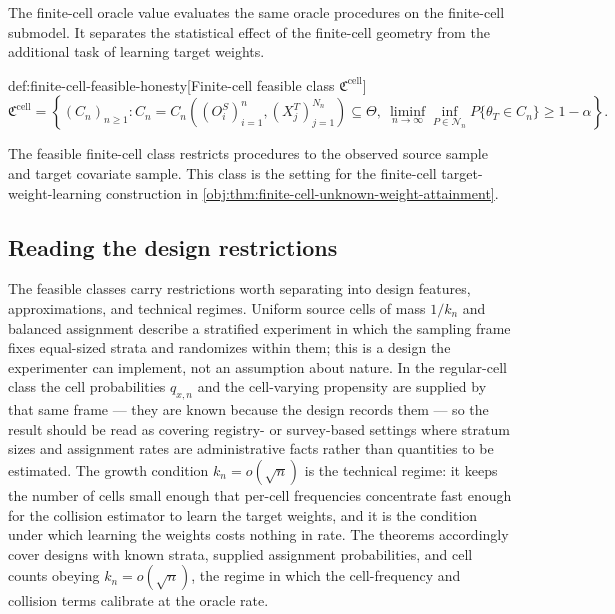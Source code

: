 The finite-cell oracle value  evaluates the same oracle procedures on the finite-cell submodel. It separates the statistical effect of the finite-cell geometry from the additional task of learning target weights.

\begin{definitionv}{def:finite-cell-feasible-honesty}[Finite-cell feasible class $\mathfrak C^{\mathrm{cell}}$]
\[
\mathfrak C^{\mathrm{cell}}
=
\left\{
(C_n)_{n\ge 1} :
C_n
=
C_n\!\left((O_i^S)_{i=1}^n,(X_j^T)_{j=1}^{N_n}\right)
\subseteq \Theta,\ 
\liminf_{n\to\infty}\inf_{P\in\mathcal N_n}
P\{\theta_T\in C_n\}
\ge 1-\alpha
\right\}.
\]
\end{definitionv}

The feasible finite-cell class  restricts procedures to the observed source sample and target covariate sample. This class is the setting for the finite-cell target-weight-learning construction in \cref{obj:thm:finite-cell-unknown-weight-attainment}.

\subsection{Reading the design restrictions}

The feasible classes carry restrictions worth separating into design features, approximations, and
technical regimes. Uniform source cells of mass \(1/k_n\) and balanced assignment describe a stratified
experiment in which the sampling frame fixes equal-sized strata and randomizes within them; this is a
design the experimenter can implement, not an assumption about nature. In the regular-cell class the
cell probabilities \(q_{x,n}\) and the cell-varying propensity are supplied by that same frame — they
are known because the design records them — so the result should be read as covering registry- or
survey-based settings where stratum sizes and assignment rates are administrative facts rather than
quantities to be estimated. The growth condition \(k_n=o(\sqrt n)\) is the technical regime: it keeps
the number of cells small enough that per-cell frequencies concentrate fast enough for the collision
estimator to learn the target weights, and it is the condition under which learning the weights costs
nothing in rate. The theorems accordingly cover designs with known strata, supplied assignment probabilities, and cell counts obeying \(k_n=o(\sqrt n)\), the regime in which the cell-frequency and collision terms calibrate at the oracle rate.
